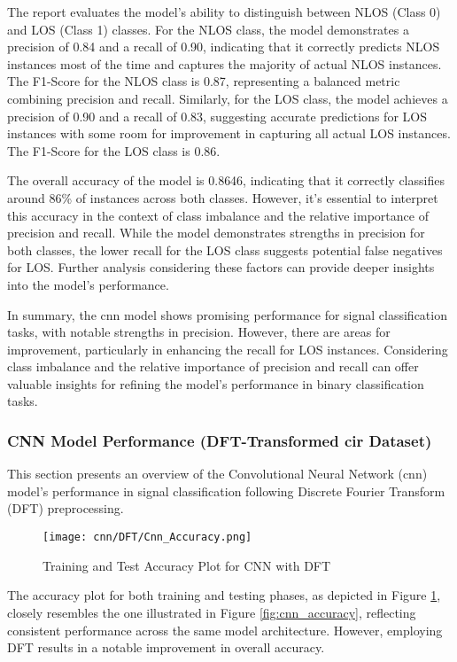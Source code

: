 The report evaluates the model's ability to distinguish between NLOS (Class 0) and LOS (Class 1) classes. For the NLOS class, the model demonstrates a precision of  0.84 and a recall of 0.90, indicating that it correctly predicts NLOS instances most of the time and captures the majority of actual NLOS instances. The F1-Score for the NLOS class is 0.87, representing a balanced metric combining precision and recall. Similarly, for the LOS class, the model achieves a precision of 0.90 and a recall of 0.83, suggesting accurate predictions for LOS instances with some room for improvement in capturing all actual LOS instances. The F1-Score for the LOS class is 0.86.

The overall accuracy of the model is 0.8646, indicating that it correctly classifies around 86\% of instances across both classes. However, it's essential to interpret this accuracy in the context of class imbalance and the relative importance of precision and recall. While the model demonstrates strengths in precision for both classes, the lower recall for the LOS class suggests potential false negatives for LOS. Further analysis considering these factors can provide deeper insights into the model's performance.

In summary, the \acrshort{cnn} model shows promising performance for signal classification tasks, with notable strengths in precision. However, there are areas for improvement, particularly in enhancing the recall for LOS instances. Considering class imbalance and the relative importance of precision and recall can offer valuable insights for refining the model's performance in binary classification tasks.

\subsubsection{CNN Model Performance (DFT-Transformed \acrshort{cir} Dataset)}

This section presents an overview of the Convolutional Neural Network (\acrshort{cnn}) model's performance in signal classification following Discrete Fourier Transform (DFT) preprocessing.

\begin{figure}[H] 
    \centering
    \texttt{[image: cnn/DFT/Cnn\_Accuracy.png]}
    \caption{Training and Test Accuracy Plot for CNN with DFT}\label{fig:cnn_accuracy_DFT}
\end{figure}

The accuracy plot for both training and testing phases, as depicted in Figure \ref{fig:cnn_accuracy_DFT}, closely resembles the one illustrated in Figure \ref{fig:cnn_accuracy}, reflecting consistent performance across the same model architecture. However, employing DFT results in a notable improvement in overall accuracy.

